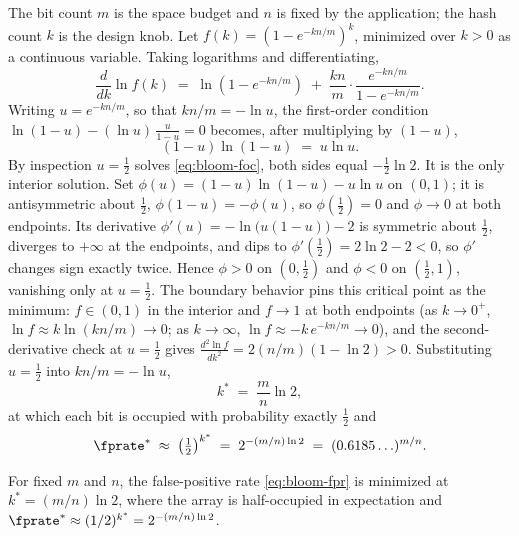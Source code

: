 The bit count $m$ is the space budget and $n$ is fixed by the application;
the hash count $k$ is the design knob. Let $f(k) = (1 - e^{-kn/m})^k$,
minimized over $k > 0$ as a continuous variable. Taking logarithms and
differentiating,
\[
  \frac{d}{dk}\ln f(k)
  \;=\; \ln(1 - e^{-kn/m})
  \;+\; \frac{kn}{m}\cdot\frac{e^{-kn/m}}{1 - e^{-kn/m}}.
\]
Writing $u = e^{-kn/m}$, so that $kn/m = -\ln u$, the first-order condition
$\ln(1-u) - (\ln u)\,\tfrac{u}{1-u} = 0$ becomes, after multiplying by
$(1-u)$,
\begin{equation}
  (1 - u)\ln(1 - u) \;=\; u \ln u.
  \label{eq:bloom-foc}
\end{equation}
By inspection $u = \tfrac12$ solves \eqref{eq:bloom-foc}, both sides equal
$-\tfrac12\ln 2$. It is the only interior solution. Set
$\phi(u) = (1-u)\ln(1-u) - u\ln u$ on $(0,1)$; it is antisymmetric about
$\tfrac12$, $\phi(1-u) = -\phi(u)$, so $\phi(\tfrac12) = 0$ and $\phi \to 0$
at both endpoints. Its derivative $\phi'(u) = -\ln\!\big(u(1-u)\big) - 2$ is
symmetric about $\tfrac12$, diverges to $+\infty$ at the endpoints, and dips
to $\phi'(\tfrac12) = 2\ln 2 - 2 < 0$, so $\phi'$ changes sign exactly
twice. Hence $\phi > 0$ on $(0, \tfrac12)$ and $\phi < 0$ on $(\tfrac12, 1)$,
vanishing only at $u = \tfrac12$. The boundary behavior pins this critical
point as the minimum: $f \in (0,1)$ in the interior and $f \to 1$ at both
endpoints (as $k \to 0^+$, $\ln f \approx k\ln(kn/m) \to 0$; as
$k \to \infty$, $\ln f \approx -k\,e^{-kn/m} \to 0$), and the
second-derivative check at $u = \tfrac12$ gives
$\tfrac{d^2 \ln f}{dk^2} = 2(n/m)(1 - \ln 2) > 0$. Substituting
$u = \tfrac12$ into $kn/m = -\ln u$,
\begin{equation}
  k^* \;=\; \frac{m}{n}\ln 2,
  \label{eq:bloom-optimal-k}
\end{equation}
at which each bit is occupied with probability exactly $\tfrac12$ and
\begin{equation}
  \fprate^* \;\approx\; \left(\tfrac12\right)^{k^*}
  \;=\; 2^{-(m/n)\ln 2}
  \;=\; (0.6185\ldots)^{m/n}.
  \label{eq:bloom-optimal-fpr}
\end{equation}

\begin{theorem}
\label{thm:bloom-optimal-k}
For fixed $m$ and $n$, the false-positive rate \eqref{eq:bloom-fpr} is
minimized at $k^* = (m/n)\ln 2$, where the array is half-occupied in
expectation and $\fprate^* \approx (1/2)^{k^*} = 2^{-(m/n)\ln 2}$.
\end{theorem}

